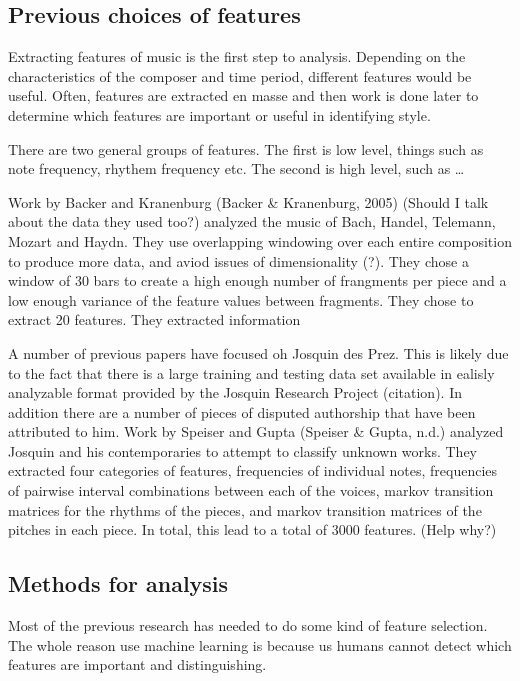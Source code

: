 \documentclass[12pt,twoside]{reedthesis}
\theoremstyle{definition}
\theoremstyle{definition}
\theoremstyle{definition}
\theoremstyle{remark}
\begin{document}
\subsection{Previous choices of
features}\label{previous-choices-of-features}

Extracting features of music is the first step to analysis. Depending on
the characteristics of the composer and time period, different features
would be useful. Often, features are extracted en masse and then work is
done later to determine which features are important or useful in
identifying style.

There are two general groups of features. The first is low level, things
such as note frequency, rhythem frequency etc. The second is high level,
such as \ldots{}

Work by Backer and Kranenburg (Backer \& Kranenburg, 2005) (Should I
talk about the data they used too?) analyzed the music of Bach, Handel,
Telemann, Mozart and Haydn. They use overlapping windowing over each
entire composition to produce more data, and aviod issues of
dimensionality (?). They chose a window of 30 bars to create a high
enough number of frangments per piece and a low enough variance of the
feature values between fragments. They chose to extract 20 features.
They extracted information

A number of previous papers have focused oh Josquin des Prez. This is
likely due to the fact that there is a large training and testing data
set available in ealisly analyzable format provided by the Josquin
Research Project (citation). In addition there are a number of pieces of
disputed authorship that have been attributed to him. Work by Speiser
and Gupta (Speiser \& Gupta, n.d.) analyzed Josquin and his
contemporaries to attempt to classify unknown works. They extracted four
categories of features, frequencies of individual notes, frequencies of
pairwise interval combinations between each of the voices, markov
transition matrices for the rhythms of the pieces, and markov transition
matrices of the pitches in each piece. In total, this lead to a total of
3000 features. (Help why?)

\subsection{Methods for analysis}\label{methods-for-analysis}

Most of the previous research has needed to do some kind of feature
selection. The whole reason use machine learning is because us humans
cannot detect which features are important and distinguishing.
\end{document}
